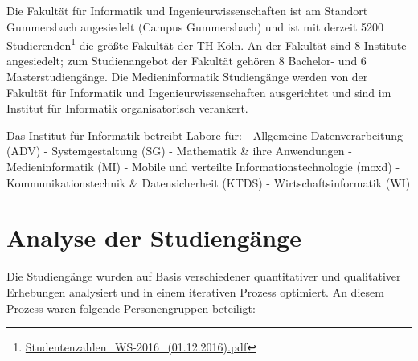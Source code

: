 Die Fakultät für Informatik und Ingenieurwissenschaften ist am Standort
Gummersbach angesiedelt (Campus Gummersbach) und ist mit derzeit 5200
Studierenden\footnote{\href{../anhaenge/Studentenzahlen_WS-2016_(01.12.2016).pdf}{Studentenzahlen\_WS-2016\_(01.12.2016).pdf}}
die größte Fakultät der TH Köln. An der Fakultät sind 8 Institute
angesiedelt; zum Studienangebot der Fakultät gehören 8 Bachelor- und 6
Masterstudiengänge. Die Medieninformatik Studiengänge werden von der
Fakultät für Informatik und Ingenieurwissenschaften ausgerichtet und
sind im Institut für Informatik organisatorisch verankert.

Das Institut für Informatik betreibt Labore für: - Allgemeine
Datenverarbeitung (ADV) - Systemgestaltung (SG) - Mathematik \& ihre
Anwendungen - Medieninformatik (MI) - Mobile und verteilte
Informationstechnologie (moxd) - Kommunikationstechnik \&
Datensicherheit (KTDS) - Wirtschaftsinformatik (WI)

\chapter{Analyse der Studiengänge}\label{analyse-der-studienguxe4nge}

Die Studiengänge wurden auf Basis verschiedener quantitativer und
qualitativer Erhebungen analysiert und in einem iterativen Prozess
optimiert. An diesem Prozess waren folgende Personengruppen beteiligt:

